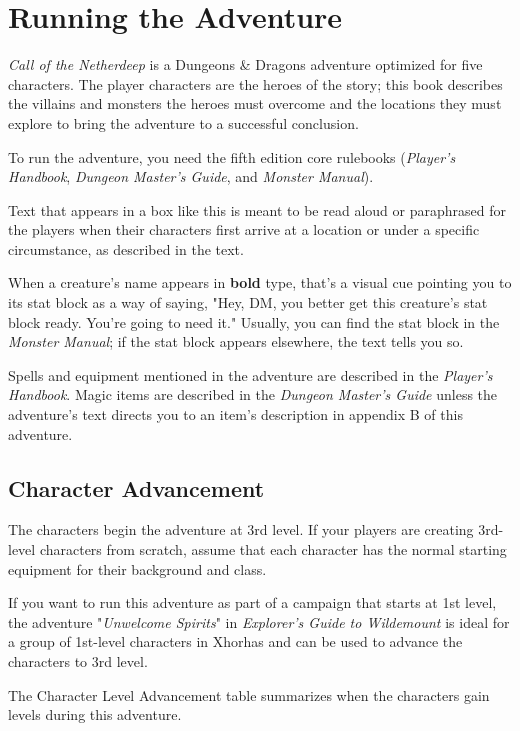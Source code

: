 \documentclass[10pt,a4paper,twoside,fancy,bg=print,twocolumn,openany,nodeprecatedcode]{dndbook}
\begin{document}
\section{Running the Adventure}
\textit{Call of the Netherdeep} is a Dungeons \& Dragons adventure optimized for five characters. The player characters are the heroes of the story; this book describes the villains and monsters the heroes must overcome and the locations they must explore to bring the adventure to a successful conclusion.

To run the adventure, you need the fifth edition core rulebooks (\textit{Player's Handbook}, \textit{Dungeon Master's Guide}, and \textit{Monster Manual}).

\begin{DndReadAloud}{}
Text that appears in a box like this is meant to be read aloud or paraphrased for the players when their characters first arrive at a location or under a specific circumstance, as described in the text.

\end{DndReadAloud}

When a creature's name appears in \textbf{bold} type, that's a visual cue pointing you to its stat block as a way of saying, "Hey, DM, you better get this creature's stat block ready. You're going to need it." Usually, you can find the stat block in the \textit{Monster Manual}; if the stat block appears elsewhere, the text tells you so.

Spells and equipment mentioned in the adventure are described in the \textit{Player's Handbook}. Magic items are described in the \textit{Dungeon Master's Guide} unless the adventure's text directs you to an item's description in appendix B of this adventure.

\subsection{Character Advancement}
The characters begin the adventure at 3rd level. If your players are creating 3rd-level characters from scratch, assume that each character has the normal starting equipment for their background and class.

If you want to run this adventure as part of a campaign that starts at 1st level, the adventure "\textit{Unwelcome Spirits}" in \textit{Explorer's Guide to Wildemount} is ideal for a group of 1st-level characters in Xhorhas and can be used to advance the characters to 3rd level.

The Character Level Advancement table summarizes when the characters gain levels during this adventure.
\end{document}

